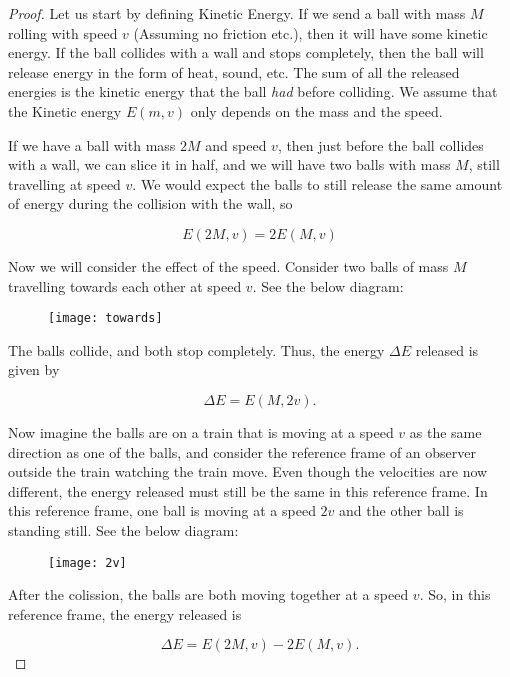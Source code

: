 \documentclass{homework}
\begin{document}
\begin{proof}
Let us start by defining Kinetic Energy. If we send a ball with mass $M$ rolling with speed $v$ (Assuming no friction etc.), then it will have some kinetic energy. If the ball collides with a wall and stops completely, then the ball will release energy in the form of heat, sound, etc. The sum of all the released energies is the kinetic energy that the ball \textit{had} before colliding. We assume that the Kinetic energy $E(m, v)$ only depends on the mass and the speed.

If we have a ball with mass $2M$ and speed $v$, then just before the ball collides with a wall, we can slice it in half, and we will have two balls with mass $M$, still travelling at speed $v$. We would expect the balls to still release the same amount of energy during the collision with the wall, so 

\begin{equation*}
    E(2M, v) = 2E(M, v)
\end{equation*}

Now we will consider the effect of the speed. Consider two balls of mass $M$ travelling towards each other at speed $v$. See the below diagram:

\begin{figure}
    \texttt{[image: towards]}
\end{figure}

The balls collide, and both stop completely. Thus, the energy $\Delta E$ released is given by 

\begin{equation*}
    \Delta E = E(M, 2v).
\end{equation*}

Now imagine the balls are on a train that is moving at a speed $v$ as the same direction as one of the balls, and consider the reference frame of an observer outside the train watching the train move. Even though the velocities are now different, the energy released must still be the same in this reference frame. In this reference frame, one ball is moving at a speed $2v$ and the other ball is standing still. See the below diagram:

\begin{figure}
    \texttt{[image: 2v]}
\end{figure}

After the colission, the balls are both moving together at a speed $v$. So, in this reference frame, the energy released is

\begin{equation*}
    \Delta E = E(2M, v) - 2E(M, v).
\end{equation*}


\end{proof}
\end{document}
